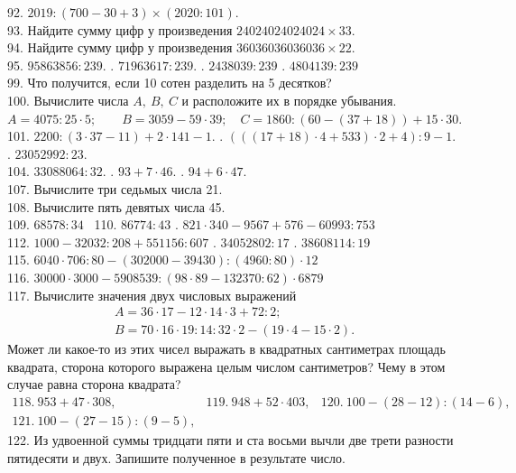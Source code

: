 \documentclass[12pt]{article}
\begin{document}
92. $2019:(700-30+3) \times (2020:101).$\\
93. Найдите сумму цифр у произведения $24024024024024\times33.$\\
94. Найдите сумму цифр у произведения $36 036 036 036 036 \times 22.$\\
95. $95863856:239.$ . $71963617:239.$ . $2438039 : 239$ . $4804139 : 239$\\
99. Что получится, если 10 сотен разделить на 5 десятков?\\
100. Вычислите числа $A,\ B,\ C$ и расположите их в порядке убывания.\\
$A=4075:25\cdot5; \qquad B=3059-59\cdot39; \quad C=1860:(60-(37+18))+15\cdot30.$\\
101. $2200:(3\cdot37-11)+2\cdot141-1.$ . $(((17+18)\cdot4+533)\cdot2+4):9-1.$ . $23052992:23.$ \\ 104. $33088064:32.$
. $93+7\cdot46.$ . $94+6\cdot47.$\\
107. Вычислите три седьмых числа 21.\\
108. Вычислите пять девятых числа 45.\\
109. $68578:34$ \ 110. $86774:43$ . $821 \cdot 340 - 9567 + 576 - 60993 : 753$ \\ 112. $1000 - 32032 : 208 + 551156 : 607$ . $34052802 : 17$ . $38608114 : 19$ \\ 115. $6040 \cdot 706 : 80 - (302000 - 39430) : (4960 : 80) \cdot 12$\\
116. $30000\cdot 3000 - 5908539 : (98 \cdot 89 - 132370 : 62) \cdot 6879$\\
117. Вычислите значения двух числовых выражений
$$\begin{array}{l} A=36\cdot17-12\cdot14\cdot3+72:2;\\
B=70\cdot16\cdot19:14:32\cdot2-(19\cdot4-15\cdot2).\end{array}$$
Может ли какое-то из этих чисел выражать в квадратных сантиметрах площадь квадрата, сторона которого выражена целым числом сантиметров? Чему в этом случае равна сторона квадрата?\\
$\begin{array}{lll}
118.\ 953 + 47 \cdot 308,& 119.\ 948 + 52 \cdot 403,& 120.\ 100 - (28 - 12) : (14 - 6),\\
121.\ 100 - (27 - 15) : (9 - 5),
\end{array}$\\
122. Из удвоенной суммы тридцати пяти и ста восьми вычли две трети разности пятидесяти и двух. Запишите полученное в результате число.\\
\end{document}
